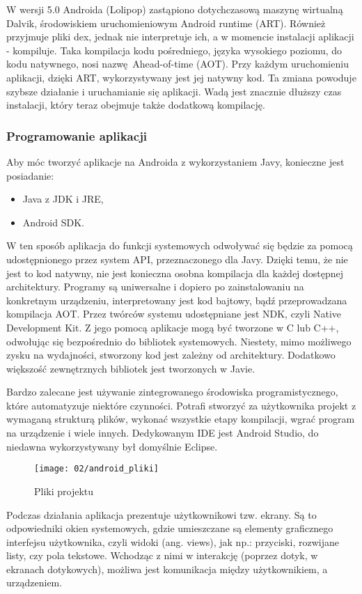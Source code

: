 W wersji 5.0 Androida (Lolipop) zastąpiono dotychczasową maszynę wirtualną Dalvik, środowiskiem uruchomieniowym Android runtime (ART). Również przyjmuje pliki dex, jednak nie interpretuje ich, a w momencie instalacji aplikacji - kompiluje. Taka kompilacja kodu pośredniego, języka wysokiego poziomu, do kodu natywnego, nosi nazwę Ahead-of-time (AOT). Przy każdym uruchomieniu aplikacji, dzięki ART, wykorzystywany jest jej natywny kod. Ta zmiana powoduje szybsze działanie i uruchamianie się aplikacji. Wadą jest znacznie dłuższy czas instalacji, który teraz obejmuje także dodatkową kompilację.


\subsubsection*{Programowanie aplikacji}
Aby móc tworzyć aplikacje na Androida z wykorzystaniem Javy, konieczne jest posiadanie:
\begin{itemize}
	\item Java z JDK i JRE,
	\item Android SDK.
\end{itemize}
W ten sposób aplikacja do funkcji systemowych odwoływać się będzie za pomocą udostępnionego przez system API, przeznaczonego dla Javy. Dzięki temu, że nie jest to kod natywny, nie jest konieczna osobna kompilacja dla każdej dostępnej architektury. Programy są uniwersalne i dopiero po zainstalowaniu na konkretnym urządzeniu, interpretowany jest kod bajtowy, bądź przeprowadzana kompilacja AOT. Przez twórców systemu udostępniane jest NDK, czyli Native Development Kit. Z jego pomocą aplikacje mogą być tworzone w C lub C++, odwołując się bezpośrednio do bibliotek systemowych. Niestety, mimo możliwego zysku na wydajności, stworzony kod jest zależny od architektury. Dodatkowo większość zewnętrznych bibliotek jest tworzonych w Javie. 

Bardzo zalecane jest używanie zintegrowanego środowiska programistycznego, które automatyzuje niektóre czynności. Potrafi stworzyć za użytkownika projekt z wymaganą strukturą plików, wykonać wszystkie etapy kompilacji, wgrać program na urządzenie i wiele innych. Dedykowanym IDE jest Android Studio, do niedawna wykorzystywany był domyślnie Eclipse.

\begin{wrapfigure}[12]{p}{0.25\textwidth}
	\vspace{-15pt}
	\begin{center}
		\texttt{[image: 02/android\_pliki]}
	\end{center}
	\vspace{-10pt}
	\caption{Pliki projektu}
	\vspace{-10pt}
\end{wrapfigure}
Podczas działania aplikacja prezentuje użytkownikowi tzw. ekrany. Są to odpowiedniki okien systemowych, gdzie umieszczane są elementy graficznego interfejsu użytkownika, czyli widoki (ang. views), jak np.: przyciski, rozwijane listy, czy pola tekstowe. Wchodząc z nimi w interakcję (poprzez dotyk, w ekranach dotykowych), możliwa jest komunikacja między użytkownikiem, a urządzeniem. 

